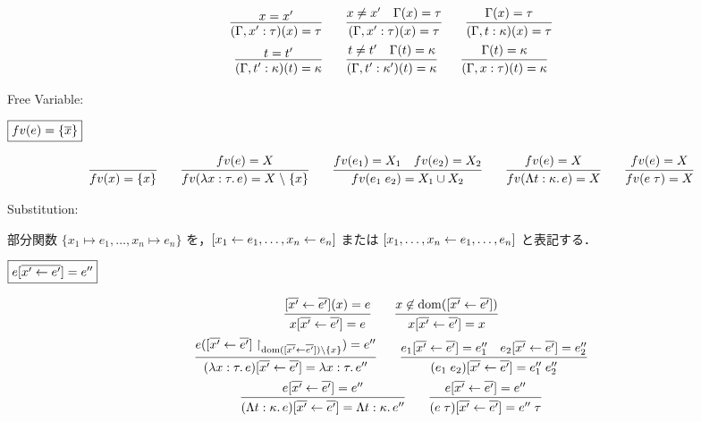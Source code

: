 \begin{gather*}
  \infer{(\Gamma, x': \tau)(x) = \tau}{
    x = x'
  }
  \hspace{2em}
  \infer{(\Gamma, x': \tau)(x) = \tau}{
    x \neq x'
    &
    \Gamma(x) = \tau
  }
  \hspace{2em}
  \infer{(\Gamma, t: \kappa)(x) = \tau}{
    \Gamma(x) = \tau
  }
  \\
  \infer{(\Gamma, t': \kappa)(t) = \kappa}{
    t = t'
  }
  \hspace{2em}
  \infer{(\Gamma, t': \kappa')(t) = \kappa}{
    t \neq t'
    &
    \Gamma(t) = \kappa
  }
  \hspace{2em}
  \infer{(\Gamma, x: \tau)(t) = \kappa}{
    \Gamma(t) = \kappa
  }
\end{gather*}

Free Variable:

$\fbox{$\mathop{fv}(e) = \{\overline{x}\}$}$

\begin{gather*}
  \infer{\freevar(x) = \{x\}}{}
  \hspace{2em}
  \infer{\freevar(\lambda x: \tau\ldotp e) = X \rcomplement \{x\}}{
    \freevar(e) = X
  }
  \hspace{2em}
  \infer{\freevar(e_1\; e_2) = X_1 \cup X_2}{
    \freevar(e_1) = X_1
    &
    \freevar(e_2) = X_2
  }
  \hspace{2em}
  \infer{\freevar(\Lambda t: \kappa\ldotp e) = X}{
    \freevar(e) = X
  }
  \hspace{2em}
  \infer{\freevar(e\; \tau) = X}{
    \freevar(e) = X
  }
\end{gather*}

Substitution:

部分関数 $\{x_1 \mapsto e_1, \ldots, x_n \mapsto e_n\}$ を，$[x_1 \gets e_1, \ldots, x_n \gets e_n]$ または $[x_1, \ldots, x_n \gets e_1, \ldots, e_n]$ と表記する．

$\fbox{$e[\overline{x' \gets e'}] = e''$}$

\begin{gather*}
  \infer{x[\overline{x'} \assign \overline{e'}] = e}{
    [\overline{x'} \assign \overline{e'}](x) = e
  }
  \hspace{2em}
  \infer{x[\overline{x'} \assign \overline{e'}]= x}{
    x \not\in \dom([\overline{x'} \assign \overline{e'}])
  }
  \\
  \infer{(\lambda x: \tau\ldotp e)[\overline{x'} \assign \overline{e'}] = \lambda x: \tau\ldotp e''}{
    e([\overline{x'} \assign \overline{e'}]\restrict_{\dom([\overline{x'} \assign \overline{e'}]) \rcomplement \{x\}}) = e''
  }
  \hspace{2em}
  \infer{(e_1\; e_2)[\overline{x'} \assign \overline{e'}] = e''_1\; e''_2}{
    e_1[\overline{x'} \assign \overline{e'}] = e''_1
    &
    e_2[\overline{x'} \assign \overline{e'}] = e''_2
  }
  \\
  \infer{(\Lambda t: \kappa\ldotp e)[\overline{x'} \assign \overline{e'}] = \Lambda t: \kappa\ldotp e''}{
    e[\overline{x'} \assign \overline{e'}] = e''
  }
  \hspace{2em}
  \infer{(e\; \tau)[\overline{x'} \assign \overline{e'}] = e''\; \tau}{
    e[\overline{x'} \assign \overline{e'}] = e''
  }
\end{gather*}

